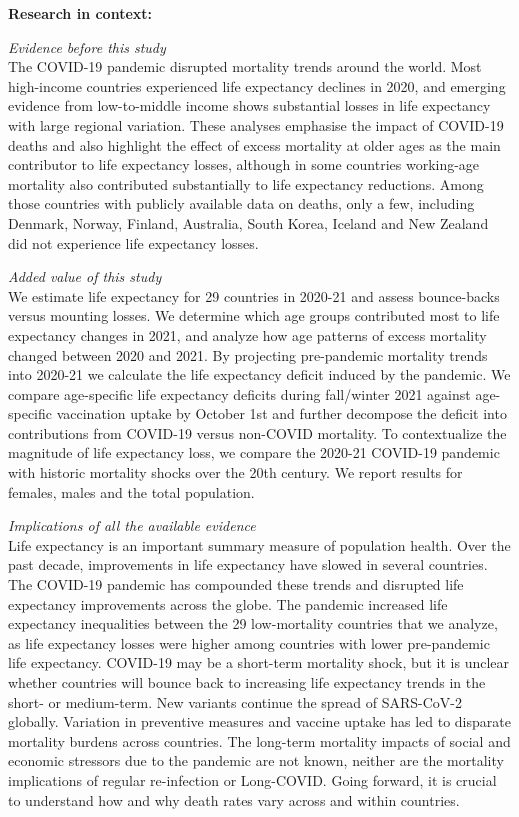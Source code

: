 \documentclass[12pt]{article}
\begin{document}
\begin{titlepage}
{\textbf{Research in context:}\par
\textit{Evidence before this study}\\
The COVID-19 pandemic disrupted mortality trends around the world. Most high-income countries experienced life expectancy declines in 2020, and emerging evidence from low-to-middle income shows substantial losses in life expectancy with large regional variation. These analyses emphasise the impact of COVID-19 deaths and also highlight the effect of excess mortality at older ages as the main contributor to life expectancy losses, although in some countries working-age mortality also contributed substantially to life expectancy reductions. Among those countries with publicly available data on deaths, only a few, including Denmark, Norway, Finland, Australia, South Korea, Iceland and New Zealand did not experience life expectancy losses.
\par
\textit{Added value of this study}\\
We estimate life expectancy for 29 countries in 2020-21 and assess bounce-backs versus mounting losses. We determine which age groups contributed most to life expectancy changes in 2021, and analyze how age patterns of excess mortality changed between 2020 and 2021. By projecting pre-pandemic mortality trends into 2020-21 we calculate the life expectancy deficit induced by the pandemic. We compare age-specific life expectancy deficits during fall/winter 2021 against age-specific vaccination uptake by October 1st and further decompose the deficit into contributions from COVID-19 versus non-COVID mortality. To contextualize the magnitude of life expectancy loss, we compare the 2020-21 COVID-19 pandemic with historic mortality shocks over the 20th century. We report results for females, males and the total population.
\par
\textit{Implications of all the available evidence}\\
Life expectancy is an important summary measure of population health. Over the past decade, improvements in life expectancy have slowed in several countries. The COVID-19 pandemic has compounded these trends and disrupted life expectancy improvements across the globe. The pandemic increased life expectancy inequalities between the 29 low-mortality countries  that we analyze, as life expectancy losses were higher among countries with lower pre-pandemic life expectancy. COVID-19 may be a short-term mortality shock, but it is unclear whether countries will bounce back to increasing life expectancy trends in the short- or medium-term. New variants continue the spread of SARS-CoV-2 globally. Variation in preventive measures and vaccine uptake has led to disparate mortality burdens across countries. The long-term mortality impacts of social and economic stressors due to the pandemic are not known, neither are the mortality implications of regular re-infection or Long-COVID. Going forward, it is crucial to understand how and why death rates vary across and within countries.
\par
\par\medskip}

\end{titlepage}
\end{document}
